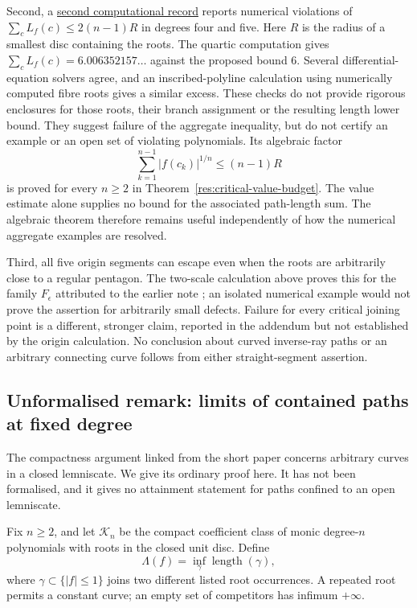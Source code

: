 Second, a
\href{https://github.com/wcook04/plectis-erdos/blob/f214a6b45528dc5eefe20ffadc35f2e981627d4c/research_corpus/Erdos1041/SeparatrixAggregateReduction.md}{second computational record}
reports numerical violations of
$\sum_cL_f(c)\le2(n-1)R$ in degrees four and five. Here $R$ is the radius of
a smallest disc containing the roots. The quartic computation gives
$\sum_cL_f(c)=6.006352157\ldots$ against the proposed bound $6$.
Several differential-equation solvers agree, and an inscribed-polyline
calculation using numerically computed fibre roots gives a similar excess.
These checks do not provide rigorous enclosures for those roots, their
branch assignment or the resulting length lower bound. They suggest failure of the aggregate inequality, but do not certify
an example or an open set of violating polynomials. Its algebraic factor
\[
 \sum_{k=1}^{n-1}|f(c_k)|^{1/n}\le(n-1)R
\]
is proved for every $n\ge2$ in Theorem~\ref{res:critical-value-budget}.
The value estimate alone supplies no bound for the associated path-length
sum. The algebraic theorem therefore remains useful independently of how
the numerical aggregate examples are resolved.

Third, all five origin segments can escape even when the roots are
arbitrarily close to a regular pentagon. The two-scale calculation above
proves this for the family $F_\epsilon$ attributed to the earlier note
\cite[Proposition~A of the earlier note]{revision2026}; an
isolated numerical example would not prove the assertion for arbitrarily
small defects. Failure for every critical joining point is a different,
stronger claim, reported in the addendum but not established by the
origin calculation. No conclusion about curved inverse-ray paths or an
arbitrary connecting curve follows from either straight-segment assertion.

\subsection*{Unformalised remark: limits of contained paths at fixed degree}
\hypertarget{closed-class-limits}{}
The compactness argument linked from the short paper concerns arbitrary
curves in a closed lemniscate. We give its ordinary proof here. It has
not been formalised, and it gives no attainment statement for paths
confined to an open lemniscate.

Fix $n\ge2$, and let $\mathcal K_n$ be the compact coefficient class of
monic degree-$n$ polynomials with roots in the closed unit disc.  Define
\[
 \Lambda(f)=\inf_\gamma\operatorname{length}(\gamma),
\]
where $\gamma\subset\{|f|\le1\}$ joins two different listed root
occurrences. A repeated root permits a constant curve; an empty set of
competitors has infimum $+\infty$.

